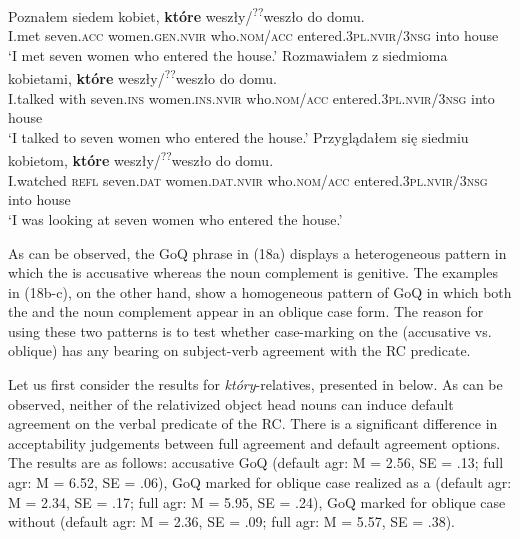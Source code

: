 \documentclass[output=paper]{langsci/langscibook}
\begin{document}
\ea%
    \label{ex:leska:18}
    \ea
    \gll Poznałem   siedem   kobiet,   \textbf{które}     weszły/\textsuperscript{??}weszło   do   domu.  \\
          I.met   seven.\textsc{acc}   women.\textsc{gen.nvir}  who.\textsc{nom/acc} entered.\textsc{3pl.nvir}/\textsc{3nsg}   into  house  \\
    \glt ‘I met seven women who entered the house.’
    \ex
    \gll Rozmawiałem   z   siedmioma  kobietami,  \textbf{które}                                                          weszły/\textsuperscript{??}weszło   do   domu.\\
         I.talked   with   seven.\textsc{ins}   women.\textsc{ins.nvir}  who.\textsc{nom/acc}      entered.\textsc{3pl.nvir}/\textsc{3nsg} into   house   \\
    \glt ‘I talked to seven women who entered the house.’
    \ex 
    \gll Przyglądałem się   siedmiu   kobietom,    \textbf{które}    weszły/\textsuperscript{??}weszło       do   domu.\\
         I.watched    \textsc{refl}   seven.\textsc{dat}   women.\textsc{dat.nvir}   who.\textsc{nom/acc} entered.\textsc{3pl.nvir}/\textsc{3nsg}   into house \\
    \glt ‘I was looking at seven women who entered the house.’
    \z
\z
  
As can be observed, the GoQ phrase in (18a) displays a heterogeneous pattern in which the  is accusative whereas the noun complement is genitive. The examples in (18b-c), on the other hand, show a homogeneous pattern of GoQ in which both the  and the noun complement appear in an oblique case form. The reason for using these two patterns is to test whether case-marking on the  (accusative vs. oblique) has any bearing on subject-verb agreement with the RC predicate.

Let us first consider the results for \textit{który}{}-relatives, presented in  below. As can be observed, neither of the relativized object head nouns can induce default agreement on the verbal predicate of the RC. There is a significant difference in acceptability judgements between full agreement and default agreement options. The results are as follows: accusative GoQ (default agr: M = 2.56, SE = .13; full agr: M = 6.52, SE = .06), GoQ marked for oblique case realized as a  (default agr: M = 2.34, SE = .17; full agr: M = 5.95, SE = .24), GoQ marked for oblique case without  (default agr: M = 2.36, SE = .09; full agr: M = 5.57, SE = .38).
\end{document}
